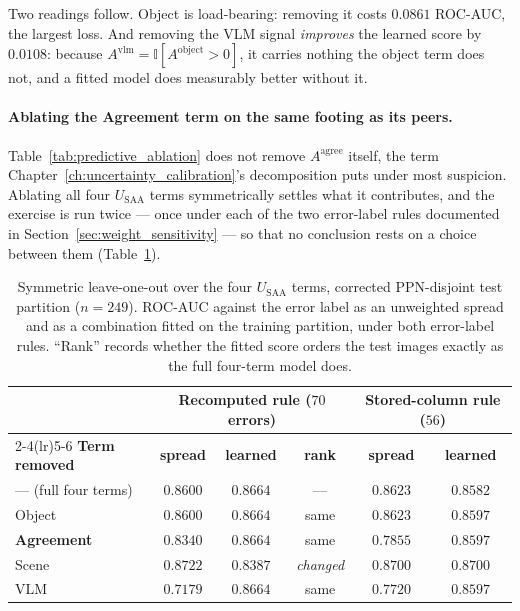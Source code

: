 \documentclass[12pt,a4paper]{report}
\begin{document}
Two readings follow. Object is load-bearing: removing it costs $0.0861$ ROC-AUC, the largest loss. And removing the VLM signal \emph{improves} the learned score by $0.0108$: because $A^{\text{vlm}} = \mathbb{I}[A^{\text{object}}>0]$, it carries nothing the object term does not, and a fitted model does measurably better without it.

\paragraph{Ablating the Agreement term on the same footing as its peers.} Table~\ref{tab:predictive_ablation} does not remove $A^{\text{agree}}$ itself,
the term Chapter~\ref{ch:uncertainty_calibration}'s decomposition puts under most suspicion. Ablating all four
$U_{\text{SAA}}$ terms symmetrically settles what it contributes, and the exercise is run twice ---
once under each of the two error-label rules documented in Section~\ref{sec:weight_sensitivity} ---
so that no conclusion rests on a choice between them (Table~\ref{tab:agree_ablation}).

\begin{table}[!htbp]
\centering
\caption[Symmetric leave-one-out over the four $U_{SAA}$ terms, corrected PPN-disjoint test partition]{Symmetric leave-one-out over the four $U_{\text{SAA}}$ terms, corrected PPN-disjoint test partition ($n=249$). ROC-AUC against the error label as an unweighted spread and as a combination fitted on the training partition, under both error-label rules. ``Rank'' records whether the fitted score orders the test images exactly as the full four-term model does.}
\label{tab:agree_ablation}
\small
\begin{tabular}{@{}l cc c cc@{}}
\toprule
& \multicolumn{3}{c}{\textbf{Recomputed rule ($70$ errors)}} & \multicolumn{2}{c}{\textbf{Stored-column rule ($56$)}} \\
\cmidrule(lr){2-4}\cmidrule(lr){5-6}
\textbf{Term removed} & \textbf{spread} & \textbf{learned} & \textbf{rank} & \textbf{spread} & \textbf{learned} \\
\midrule
--- (full four terms) & $0.8600$ & $0.8664$ & --- & $0.8623$ & $0.8582$ \\
Object & $0.8600$ & $0.8664$ & same & $0.8623$ & $0.8597$ \\
\textbf{Agreement} & $\mathbf{0.8340}$ & $\mathbf{0.8664}$ & same & $\mathbf{0.7855}$ & $\mathbf{0.8597}$ \\
Scene & $0.8722$ & $0.8387$ & \emph{changed} & $0.8700$ & $0.8700$ \\
VLM & $0.7179$ & $0.8664$ & same & $0.7720$ & $0.8597$ \\
\bottomrule
\end{tabular}
\end{table}
\end{document}
